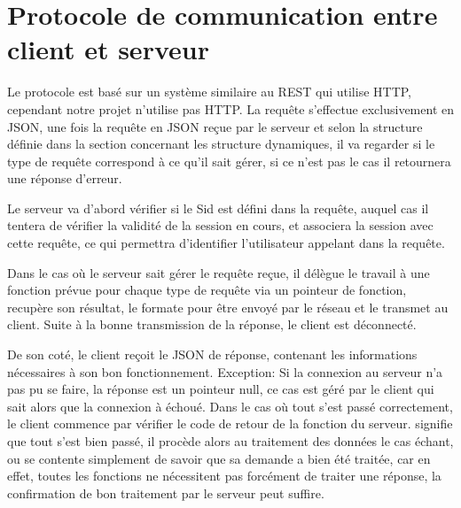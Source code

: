% 
\newpage
\section{Protocole de communication entre client et serveur}
Le protocole est basé sur un système similaire au REST qui utilise HTTP, cependant notre projet n'utilise pas HTTP.
La requête s'effectue exclusivement en JSON, une fois la requête en JSON reçue par le serveur et selon la structure définie dans la section concernant les structure dynamiques, il va regarder si le type de requête correspond à ce qu'il sait gérer, si ce n'est pas le cas il retournera une réponse d'erreur.\par
Le serveur va d'abord vérifier si le Sid est défini dans la requête, auquel cas il tentera de vérifier la validité de la session en cours, et associera la session avec cette requête, ce qui permettra d'identifier l'utilisateur appelant dans la requête.\par
Dans le cas où le serveur sait gérer le requête reçue, il délègue le travail à une fonction prévue pour chaque type de requête via un pointeur de fonction, recupère son résultat, le formate pour être envoyé par le réseau et le transmet au client. Suite à la bonne transmission de la réponse, le client est déconnecté.\par

De son coté, le client reçoit le JSON de réponse, contenant les informations nécessaires à son bon fonctionnement. Exception: Si la connexion au serveur n'a pas pu se faire, la réponse est un pointeur null, ce cas est géré par le client qui sait alors que la connexion à échoué. Dans le cas où tout s'est passé correctement, le client commence par vérifier le code de retour de la fonction du serveur.  \fg signifie que tout s'est bien passé, il procède alors au traitement des données le cas échant, ou se contente simplement de savoir que sa demande a bien été traitée, car en effet, toutes les fonctions ne nécessitent pas forcément de traiter une réponse, la confirmation de bon traitement par le serveur peut suffire.\par

